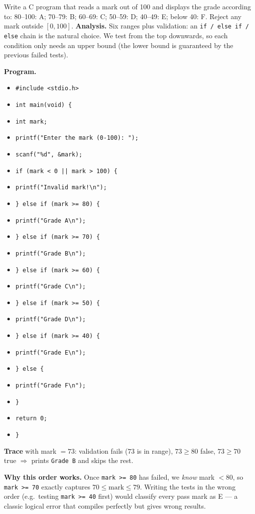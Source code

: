 \documentclass[11pt]{article}
\begin{document}
\begin{exoresolu}
Write a C program that reads a mark out of 100 and displays the grade according to: 80--100: A; 70--79: B; 60--69: C; 50--59: D; 40--49: E; below 40: F. Reject any mark outside $[0,100]$.
\tcblower
\textbf{Analysis.} Six ranges plus validation: an \texttt{if / else if / else} chain is the natural choice. We test from the top downwards, so each condition only needs an upper bound (the lower bound is guaranteed by the previous failed tests).

\textbf{Program.}
\begin{itemize}
\item \texttt{\#include <stdio.h>}
\item \texttt{int main(void) \{}
\item \texttt{\quad int mark;}
\item \texttt{\quad printf("Enter the mark (0-100): ");}
\item \texttt{\quad scanf("\%d", \&mark);}
\item \texttt{\quad if (mark < 0 || mark > 100) \{}
\item \texttt{\quad\quad printf("Invalid mark!\textbackslash n");}
\item \texttt{\quad \} else if (mark >= 80) \{}
\item \texttt{\quad\quad printf("Grade A\textbackslash n");}
\item \texttt{\quad \} else if (mark >= 70) \{}
\item \texttt{\quad\quad printf("Grade B\textbackslash n");}
\item \texttt{\quad \} else if (mark >= 60) \{}
\item \texttt{\quad\quad printf("Grade C\textbackslash n");}
\item \texttt{\quad \} else if (mark >= 50) \{}
\item \texttt{\quad\quad printf("Grade D\textbackslash n");}
\item \texttt{\quad \} else if (mark >= 40) \{}
\item \texttt{\quad\quad printf("Grade E\textbackslash n");}
\item \texttt{\quad \} else \{}
\item \texttt{\quad\quad printf("Grade F\textbackslash n");}
\item \texttt{\quad \}}
\item \texttt{\quad return 0;}
\item \texttt{\}}
\end{itemize}

\textbf{Trace} with mark $= 73$: validation fails ($73$ is in range), $73 \ge 80$ false, $73 \ge 70$ true $\Rightarrow$ prints \texttt{Grade B} and skips the rest.

\textbf{Why this order works.} Once \texttt{mark >= 80} has failed, we \emph{know} mark $< 80$, so \texttt{mark >= 70} exactly captures $70 \le \text{mark} \le 79$. Writing the tests in the wrong order (e.g.\ testing \texttt{mark >= 40} first) would classify every pass mark as E — a classic logical error that compiles perfectly but gives wrong results.
\end{exoresolu}
\end{document}
